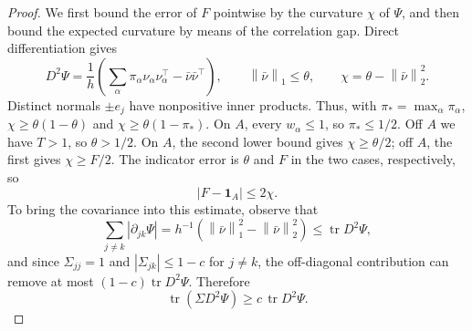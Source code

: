 \documentclass[11pt,letterpaper]{article}
\newif\ifshowrev
\newcommand{\rev}[1]{\ifshowrev{\color{revblue}%
\hypersetup{linkcolor=revblue,citecolor=revblue,urlcolor=revblue}#1}\else#1\fi}
\newcommand{\rs}[1]{\ifshowrev{\color{revblue}#1}\else#1\fi}
\newif\ifshowpass
\newcommand{\pass}[1]{\ifshowpass{\color{revblue}%
\hypersetup{linkcolor=revblue,citecolor=revblue,urlcolor=revblue}#1}\else#1\fi}
\newif\ifshowtrim
\newcommand{\trs}[1]{\ifshowtrim{\color{revblue}#1}\else#1\fi}
\theoremstyle{remark}
\newcommand{\tr}{\operatorname{tr}}
\newcommand{\norm}[1]{\left\lVert#1\right\rVert}
\newcommand{\ind}{\mathbf 1}
\begin{document}
\begin{proof}
\rev{We first bound the error of \(F\) pointwise by the curvature
\(\chi\) of \(\Psi\), and then bound the expected curvature by means of
the correlation gap.} Direct differentiation gives
\begin{equation}
 D^2\Psi=\frac1h\left(
 \sum_\alpha\pi_\alpha\nu_\alpha\nu_\alpha^\top-\rs{\bar\nu}\rs{\bar\nu}^\top\right),
 \qquad \norm{\rs{\bar\nu}}_1\le\theta,\qquad
 \chi=\theta-\norm{\rs{\bar\nu}}_2^2.
 \label{appx-eq:hessian}
\end{equation}
Distinct normals \trs{\(\pm e_j\)} have nonpositive inner products.
Thus, with \(\pi_* =\max_\alpha\pi_\alpha\),
\(\chi\ge\theta(1-\theta)\) and
\(\chi\ge\theta(1-\pi_*)\).
On \(A\), every \(w_\alpha\le1\), so \(\pi_*\le1/2\).
Off \(A\) \pass{we have} \(T>1\), so \(\theta>1/2\). On \(A\), the second
lower bound gives \(\chi\ge\theta/2\); off \(A\), the first gives
\(\chi\ge F/2\). The indicator error is \(\theta\) and \(F\)
in the two cases, respectively, so
\begin{equation}
 |F-\ind_A|\le2\chi.
 \label{appx-eq:curvature-error}
\end{equation}
To bring the covariance into this estimate, observe that
\[
 \sum_{j\ne k}|\partial_{jk}\Psi|
 =h^{-1}(\norm{\rs{\bar\nu}}_1^2-\norm{\rs{\bar\nu}}_2^2)
 \le\tr D^2\Psi,
\]
and since \(\Sigma_{jj}=1\) and \(|\Sigma_{jk}|\le1-c\) for
\(j\ne k\), the off-diagonal contribution can remove at most
\((1-c)\tr D^2\Psi\). Therefore
\begin{equation}
 \tr(\Sigma D^2\Psi)\ge c\,\tr D^2\Psi.
 \label{appx-eq:gap-contraction}
\end{equation}


\end{proof}
\end{document}
